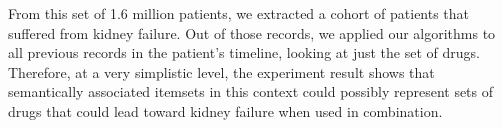 From this set of 1.6 million patients, we extracted a cohort of patients that suffered from kidney failure.  Out of those records, we applied our algorithms to all previous records in the patient's timeline, looking at just the set of drugs.  Therefore, at a very simplistic level, the experiment result shows that semantically associated itemsets in this context could possibly represent sets of drugs that could lead toward kidney failure when used in combination.



